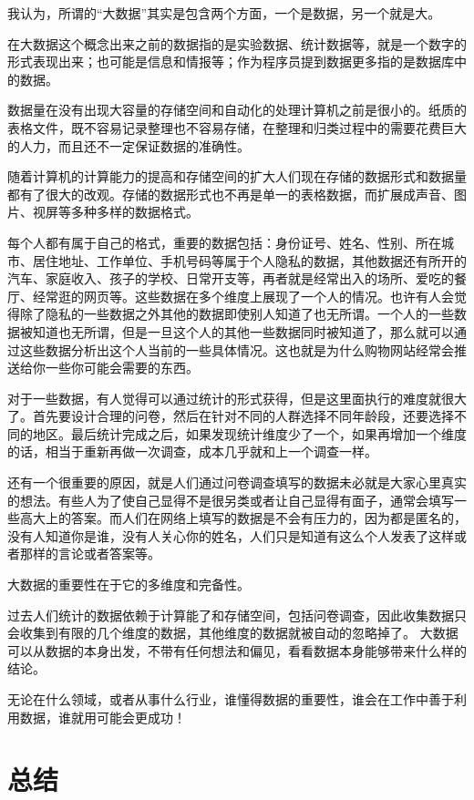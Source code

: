 \documentclass{article}
\begin{document}
我认为，所谓的“大数据”其实是包含两个方面，一个是数据，另一个就是大。

在大数据这个概念出来之前的数据指的是实验数据、统计数据等，就是一个数字的形式表现出来；也可能是信息和情报等；作为程序员提到数据更多指的是数据库中的数据。

数据量在没有出现大容量的存储空间和自动化的处理计算机之前是很小的。纸质的表格文件，既不容易记录整理也不容易存储，在整理和归类过程中的需要花费巨大的人力，而且还不一定保证数据的准确性。

随着计算机的计算能力的提高和存储空间的扩大人们现在存储的数据形式和数据量都有了很大的改观。存储的数据形式也不再是单一的表格数据，而扩展成声音、图片、视屏等多种多样的数据格式。

每个人都有属于自己的格式，重要的数据包括：身份证号、姓名、性别、所在城市、居住地址、工作单位、手机号码等属于个人隐私的数据，其他数据还有所开的汽车、家庭收入、孩子的学校、日常开支等，再者就是经常出入的场所、爱吃的餐厅、经常逛的网页等。这些数据在多个维度上展现了一个人的情况。也许有人会觉得除了隐私的一些数据之外其他的数据即使别人知道了也无所谓。一个人的一些数据被知道也无所谓，但是一旦这个人的其他一些数据同时被知道了，那么就可以通过这些数据分析出这个人当前的一些具体情况。这也就是为什么购物网站经常会推送给你一些你可能会需要的东西。

对于一些数据，有人觉得可以通过统计的形式获得，但是这里面执行的难度就很大了。首先要设计合理的问卷，然后在针对不同的人群选择不同年龄段，还要选择不同的地区。最后统计完成之后，如果发现统计维度少了一个，如果再增加一个维度的话，相当于重新再做一次调查，成本几乎就和上一个调查一样。

还有一个很重要的原因，就是人们通过问卷调查填写的数据未必就是大家心里真实的想法。有些人为了使自己显得不是很另类或者让自己显得有面子，通常会填写一些高大上的答案。而人们在网络上填写的数据是不会有压力的，因为都是匿名的，没有人知道你是谁，没有人关心你的姓名，人们只是知道有这么个人发表了这样或者那样的言论或者答案等。

大数据的重要性在于它的多维度和完备性。

过去人们统计的数据依赖于计算能了和存储空间，包括问卷调查，因此收集数据只会收集到有限的几个维度的数据，其他维度的数据就被自动的忽略掉了。
大数据可以从数据的本身出发，不带有任何想法和偏见，看看数据本身能够带来什么样的结论。

无论在什么领域，或者从事什么行业，谁懂得数据的重要性，谁会在工作中善于利用数据，谁就用可能会更成功！

\section{总结}
\end{document}
